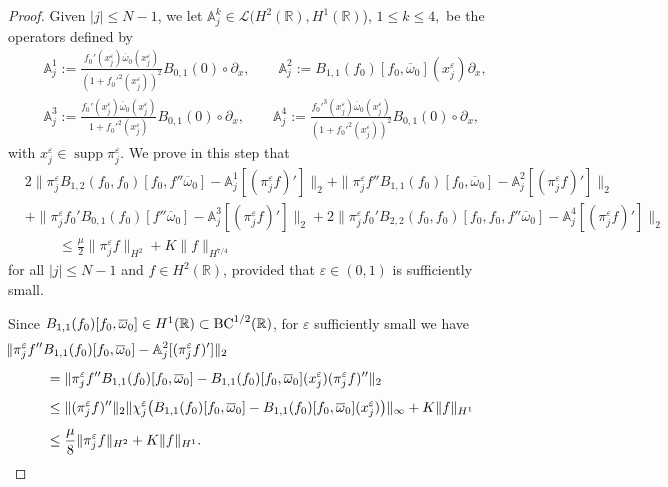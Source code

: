 \documentclass[11pt,reqno]{amsart}
\numberwithin{equation}{section}
\newcommand{\0}{\Omega}
\newcommand{\e}{\varepsilon}
\newcommand{\p}{\partial}
\newcommand{\ov}{\overline}
\newcommand{\oo}{\ov\omega}
\newcommand{\bA}{\mathbb{A}}
\newcommand{\kL}{\mathcal{L}}
\newcommand{\R}{\mathbb{R}}
\DeclareMathOperator{\supp}{supp}
\numberwithin{equation}{section}
\begin{document}
\begin{proof}
Given   $|j|\leq N-1$, we  let $ \bA_{j}^{k}\in\kL(H^2(\R),H^1(\R)$), $1\leq k\leq 4,$ be the operators defined by
\begin{equation}\label{Aj}
\begin{aligned}
 & \bA_{j}^1:=\frac{ f_0'(x_j^\e)\oo_0(x_j^\e)}{(1+f_0'^2(x_j^\e))^2}B_{0,1}(0)\circ\p_x,\qquad \bA_{j}^2:=B_{1,1}( f_0)[ f_0,\oo_0](x_j^\e)\p_x,\\[1ex]
 & \bA_{j}^3:=\frac{ f_0'(x_j^\e)\oo_0(x_j^\e)}{ 1+f_0'^2(x_j^\e) }B_{0,1}(0)\circ\p_x,\qquad \bA_{j}^4:=\frac{ f_0'^3(x_j^\e)\oo_0(x_j^\e)}{(1+f_0'^2(x_j^\e))^2}B_{0,1}(0)\circ\p_x,
\end{aligned}
\end{equation}
with $x_j^\e\in \supp \pi_j^\e.$ 
We   prove in this step  that 
\begin{align}
 &2\|\pi_j^\e B_{1,2}( f_0, f_0)[ f_0,f''\oo_0]-\bA_{j}^1[(\pi^\e_j f)']\|_{2}+\|\pi_j^\e f''B_{1,1}( f_0)[f_0,\oo_0]-\bA_{j}^2[(\pi^\e_j f)']\|_{2}\nonumber\\[1ex]
 &+\|\pi_j^\e f_0'B_{0,1}(  f_0)[ f''\oo_0]-\bA_{j}^3[(\pi^\e_j f)']\|_{2}+2\|\pi_j^\e f_0' B_{2,2}( f_0, f_0)[  f_0, f_0,f''\oo_0]-\bA_{j}^4[(\pi^\e_j f)']\|_{2}\nonumber\\[1ex]
 &\hspace{1cm}\leq \frac{\mu}{2} \|\pi_j^\e f\|_{H^2}+K\|f\|_{H^{7/4}}\label{oto3}
\end{align}
for all   $ |j|\leq N-1$ and  $f\in H^2(\R)$, provided that $\e\in(0,1)$ is sufficiently  small.

Since $B_{1,1}( f_0)[ f_0,\oo_0]\in H^1(\R)\subset {\rm BC}^{1/2}(\R)$, for $\e$ sufficiently small  we have 
\begin{align}
 &\hspace{-1cm}\|\pi_j^\e f''B_{1,1}( f_0)[f_0,\oo_0]-\bA_{j}^2[(\pi^\e_j f)']\|_{2}\nonumber\\[1ex]
 &=\|\pi_j^\e f''B_{1,1}( f_0)[f_0,\oo_0]- B_{1,1}( f_0)[ f_0,\oo_0](x_j^\e)(\pi^\e_j f)''\|_2\nonumber\\[1ex]
 &\leq   \|(\pi_j^\e f)''\|_2\|\chi_j^\e\big(B_{1,1}(f_0)[ f_0,\oo_0]- B_{1,1}(f_0)[f_0,\oo_0](x_j^\e)\big)\|_\infty+K\|  f\|_{H^{1}}\nonumber\\[1ex] 
 &\leq \frac{\mu}{8} \|\pi_j^\e f\|_{H^2}+K\|  f\|_{H^{1}}. \label{ca01}
\end{align}


\end{proof}
\end{document}
